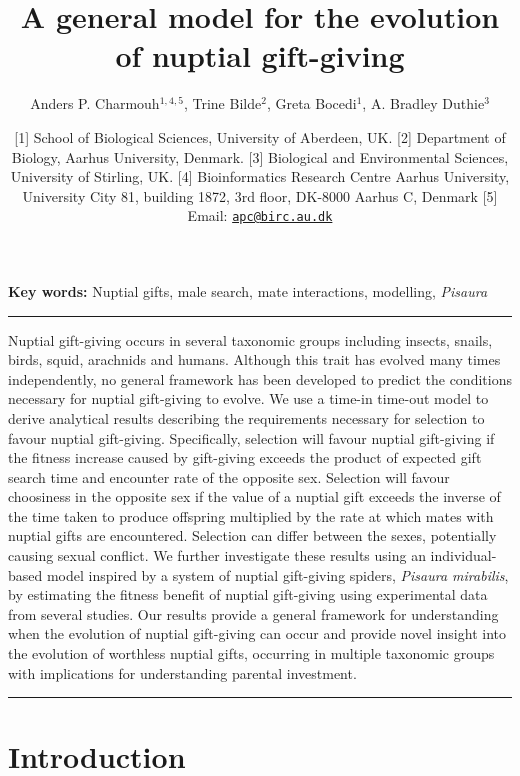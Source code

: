 \documentclass[
]{article}
\title{A general model for the evolution of nuptial gift-giving}
\author{Anders P. Charmouh\(^{1,4, 5}\), Trine Bilde\(^{2}\), Greta
Bocedi\(^{1}\), A. Bradley Duthie\(^{3}\)}
\date{{[}1{]} School of Biological Sciences, University of Aberdeen, UK.
{[}2{]} Department of Biology, Aarhus University, Denmark. {[}3{]}
Biological and Environmental Sciences, University of Stirling, UK.
{[}4{]} Bioinformatics Research Centre Aarhus University, University
City 81, building 1872, 3rd floor, DK-8000 Aarhus C, Denmark {[}5{]}
Email: \href{mailto:apc@birc.au.dk}{\nolinkurl{apc@birc.au.dk}}}
\begin{document}
\maketitle

\textbf{Key words:} Nuptial gifts, male search, mate interactions,
modelling, \emph{Pisaura}

\begin{center}\rule{0.5\linewidth}{0.5pt}\end{center}

Nuptial gift-giving occurs in several taxonomic groups including
insects, snails, birds, squid, arachnids and humans. Although this trait
has evolved many times independently, no general framework has been
developed to predict the conditions necessary for nuptial gift-giving to
evolve. We use a time-in time-out model to derive analytical results
describing the requirements necessary for selection to favour nuptial
gift-giving. Specifically, selection will favour nuptial gift-giving if
the fitness increase caused by gift-giving exceeds the product of
expected gift search time and encounter rate of the opposite sex.
Selection will favour choosiness in the opposite sex if the value of a
nuptial gift exceeds the inverse of the time taken to produce offspring
multiplied by the rate at which mates with nuptial gifts are
encountered. Selection can differ between the sexes, potentially causing
sexual conflict. We further investigate these results using an
individual-based model inspired by a system of nuptial gift-giving
spiders, \emph{Pisaura mirabilis}, by estimating the fitness benefit of
nuptial gift-giving using experimental data from several studies. Our
results provide a general framework for understanding when the evolution
of nuptial gift-giving can occur and provide novel insight into the
evolution of worthless nuptial gifts, occurring in multiple taxonomic
groups with implications for understanding parental investment.

\begin{center}\rule{0.5\linewidth}{0.5pt}\end{center}

\hypertarget{introduction}{%
\section{Introduction}\label{introduction}}
\end{document}
